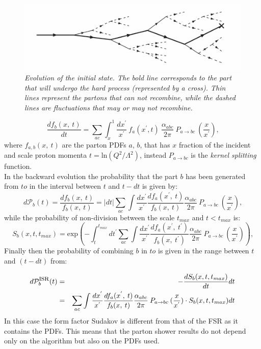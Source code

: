 \begin{figure}
\centering
\includegraphics[scale= 0.8]{../Cap3/Fig_MC/isr}
\caption{ \textit{Evolution of the initial state. The bold line corresponds to the part that will undergo the hard process (represented by a cross). Thin lines represent the partons that can not recombine, while the dashed lines are fluctuations that may or may not recombine.  }}
\label{isr}
\end{figure}

\begin{equation}
  \frac{d f_b(x, \:t)}{dt}= \sum_{ac} \int_x ^1 \frac{d x^{'}}{x^{'}} \: f_a(x^{'},t) \:\frac{\alpha_{abc}}{2\pi} \:P_{a \rightarrow bc} \:(\frac{x}{x^{'}}) \mbox{,}\end{equation}
where $f_{a,b}(x, \:t)$ are the parton PDFs  $a$, $b$, that has $ x $ fraction of the incident and scale proton momenta $t=\mbox{ln}(Q^2/ \Lambda^2) $, instead $P_{a \rightarrow bc}$ is the \textit{kernel splitting} function.\\
In the backward evolution the probability that the part $ b $ has been generated from $ to $ in the interval between $ t $ and $ t-dt $ is given by:
\begin{equation}
d\mathcal{P}_{b}(t)=\frac{d f_b(x, \:t) }{ f_b(x, \:t)}= |dt| \sum_{ac}  \int  \frac{d x^{'}}{x^{'}} \frac{d f_a(x^{'}, \:t) }{ f_b(x, \:t)} \frac{\alpha_{abc}}{2\pi}          \:P_{a \rightarrow bc} \:(\frac{x}{x^{'}})      \mbox{,}\end{equation}
while the probability of non-division between the scale $t_{max}$ and $t<t_{max}$ is:
\begin{equation}
S_b (x,t,t_{max})=   \mbox{exp} \left( - \int_t ^{t_{max}} dt^{'} \sum_{ac}  \int  \frac{d x^{'}}{x^{'}} \frac{d f_a(x^{'}, \:t^{'}) }{ f_b(x, \:t^{'})} \frac{\alpha_{abc}}{2\pi}          \:P_{a \rightarrow bc} \:(\frac{x}{x^{'}}) \right)     \mbox{,}\end{equation} 
Finally then the probability of combining $ b $ in $ to $ is given in the range between $ t $ and $ (t-dt) $ from:

\begin{eqnarray}
d \mathcal{P}_{b}^{\mbox{\footnotesize{ISR}}}(t) &=& - \frac{d S_b (x,t,t_{max})}{dt} dt \nonumber \\
&=&  \sum_{ac}  \int  \frac{d x^{'}}{x^{'}} \frac{d f_a(x^{'}, \:t) }{ f_b(x, \:t)} \frac{\alpha_{abc}}{2\pi}          \:P_{a \rightarrow bc} \:(\frac{x}{x^{'}})  \cdot S_b (x,t,t_{max}) dt \end{eqnarray}
In this case the form factor Sudakov is different from that of the FSR as it contains the PDFs.
This means that the parton shower results do not depend only on the algorithm but also on the PDFs used.

